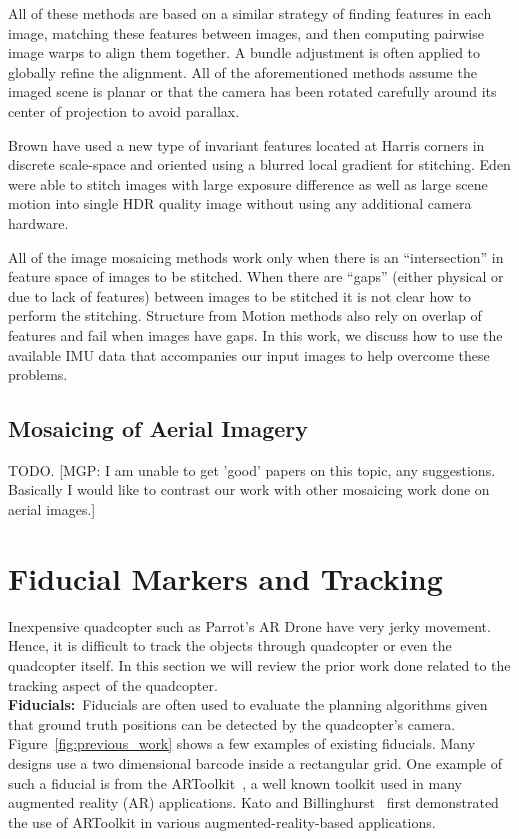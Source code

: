 All of these methods are based on a similar strategy of finding
features in each image, matching these features between images, and
then computing pairwise image warps to align them together.  A 
bundle adjustment is often applied to globally refine the alignment.
All of the aforementioned methods assume the imaged scene is planar or
that the camera has been rotated carefully around its center of
projection to avoid parallax.

Brown \etal \cite{Brown05} have used a new type of invariant features
located at Harris corners in discrete scale-space and oriented using a
blurred local gradient for stitching. Eden \etal \cite{Eden} were
able to stitch images with large exposure difference as well as large
scene motion into single HDR quality image without using any
additional camera hardware.

All of the image mosaicing methods work only when there is an
``intersection'' in feature space of images to be stitched. When there
are ``gaps'' (either physical or due to lack of features) between
images to be stitched it is not clear how to perform the
stitching. Structure from Motion methods also rely on overlap of
features and fail when images have gaps. In this work, we discuss how
to use the available IMU data that accompanies our input images to
help overcome these problems.

\subsection{Mosaicing of Aerial Imagery}
TODO. [MGP: I am unable to get 'good' papers on this topic, any suggestions.
Basically I would like to contrast our work with other mosaicing work done on
aerial images.]

\section{Fiducial Markers and Tracking}
Inexpensive quadcopter such as Parrot's AR Drone have very jerky movement. Hence,
it is difficult to track the objects through quadcopter or even the quadcopter
itself. In this section we will review the prior work done related to the
tracking aspect of the quadcopter.\\

\noindent\textbf{Fiducials:}~Fiducials are often used to evaluate the planning
algorithms given that ground truth positions can be detected by the
quadcopter's camera. Figure~\ref{fig:previous_work} shows a few
examples of existing fiducials.  Many designs use a two
dimensional barcode inside a rectangular grid. One example of such a
fiducial is from the ARToolkit~\cite{ARToolkit02}, a well known
toolkit used in many augmented reality (AR) applications. Kato and
Billinghurst~\cite{kato-artoolkit} first demonstrated the use of
ARToolkit in various augmented-reality-based applications.


